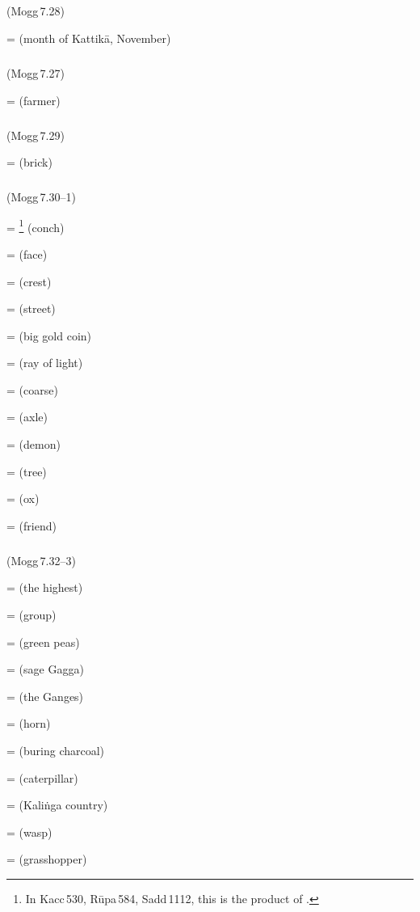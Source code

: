 \subparagraph*{} (Mogg\,7.28)\label{pacckx:tika}

 =  (month of Kattik\=a, November)\par

\subparagraph*{} (Mogg\,7.27)\label{pacckx:saka1}

 =  (farmer)\par

\subparagraph*{} (Mogg\,7.29)\label{pacckx:dthakana}

 =  (brick)\par

\subparagraph*{} (Mogg\,7.30--1)\label{pacckx:kha}

 = \footnote{In Kacc\,530, R\=upa\,584, Sadd\,1112, this is the product of .} (conch)\par
{} =  (face)\par
{} =  (crest)\par
{} =  (street)\par
{} =  (big gold coin)\par
{} =  (ray of light)\par
{} =  (coarse)\par
{} =  (axle)\par
{} =  (demon)\par
{} =  (tree)\par
{} =  (ox)\par
{} =  (friend)\par

\subparagraph*{} (Mogg\,7.32--3)\label{pacckx:gaka}

 =  (the highest)\par
{} =  (group)\par
{} =  (green peas)\par
{} =  (sage Gagga)\par
{} =  (the Ganges)\par
{} =  (horn)\par
{} =  (buring charcoal)\par
{} =  (caterpillar)\par
{} =  (Kali\.nga country)\par
{} =  (wasp)\par
{} =  (grasshopper)\par

